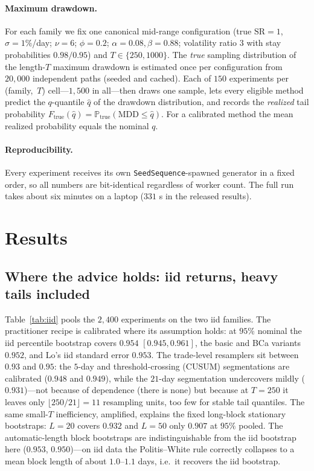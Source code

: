 \documentclass[11pt]{article}
\newcommand{\sr}{\mathrm{SR}}
\newcommand{\mdd}{\mathrm{MDD}}
\begin{document}
\paragraph{Maximum drawdown.} For each family we fix one canonical
mid-range configuration (true $\sr=1$, $\sigma=1\%$/day; $\nu=6$; $\phi=0.2$;
$\alpha=0.08,\beta=0.88$; volatility ratio $3$ with stay probabilities
$0.98/0.95$) and $T\in\{250,1000\}$. The \emph{true} sampling distribution of
the length-$T$ maximum drawdown is estimated once per configuration from
$20{,}000$ independent paths (seeded and cached). Each of $150$ experiments
per (family,~$T$) cell---$1{,}500$ in all---then draws one sample, lets every
eligible method predict the $q$-quantile $\hat q$ of the drawdown distribution,
and records the \emph{realized} tail probability
$F_{\text{true}}(\hat q) = \mathbb P_{\text{true}}(\mdd \le \hat q)$. For a
calibrated method the mean realized probability equals the nominal $q$.

\paragraph{Reproducibility.} Every experiment receives its own
\texttt{SeedSequence}-spawned generator in a fixed order, so all numbers are
bit-identical regardless of worker count. The full run takes about six minutes
on a laptop ($331$ s in the released results).

\section{Results}

\subsection{Where the advice holds: iid returns, heavy tails included}
\label{sec:iid}

Table~\ref{tab:iid} pools the $2{,}400$ experiments on the two iid families.
The practitioner recipe is calibrated where its assumption holds: at $95\%$
nominal the iid percentile bootstrap covers $0.954$ $[0.945,0.961]$, the basic
and BCa variants $0.952$, and Lo's iid standard error $0.953$. The trade-level
resamplers sit between $0.93$ and $0.95$: the $5$-day and threshold-crossing
(CUSUM) segmentations are calibrated ($0.948$ and $0.949$), while the $21$-day
segmentation undercovers mildly ($0.931$)---not because of dependence (there
is none) but because at $T=250$ it leaves only $\lfloor 250/21\rfloor = 11$
resampling units, too few for stable tail quantiles. The same
small-$T$ inefficiency, amplified, explains the fixed long-block stationary
bootstraps: $L=20$ covers $0.932$ and $L=50$ only $0.907$ at $95\%$ pooled.
The automatic-length block bootstraps are indistinguishable from the iid
bootstrap here ($0.953$, $0.950$)---on iid data the Politis--White rule
correctly collapses to a mean block length of about $1.0$--$1.1$ days, i.e.\
it recovers the iid bootstrap.
\end{document}
